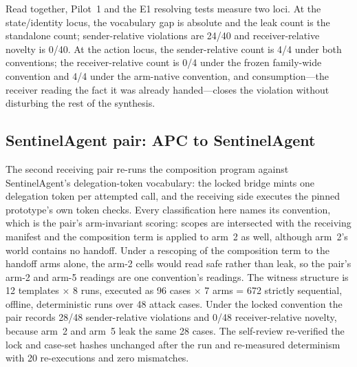 \documentclass[sigconf,anonymous,nonacm]{acmart}
\newcommand{\code}[1]{\texttt{\detokenize{#1}}}
\begin{document}
Read together, Pilot~1 and the E1 resolving tests measure two loci. At the state/identity locus, the vocabulary gap is absolute and the leak count is the standalone count; sender-relative violations are 24/40 and receiver-relative novelty is 0/40. At the action locus, the sender-relative count is 4/4 under both conventions; the receiver-relative count is 0/4 under the frozen family-wide convention and 4/4 under the arm-native convention, and consumption---the receiver reading the fact it was already handed---closes the violation without disturbing the rest of the synthesis.

\subsection{SentinelAgent pair: APC to SentinelAgent}
\label{sec:sa}

The second receiving pair re-runs the composition program against SentinelAgent's delegation-token vocabulary: the locked bridge mints one delegation token per attempted call, and the receiving side executes the pinned prototype's own token checks. Every classification here names its convention, which is the pair's arm-invariant scoring: scopes are intersected with the receiving manifest and the composition term is applied to arm~2 as well, although arm~2's world contains no handoff. Under a rescoping of the composition term to the handoff arms alone, the arm-2 \code{composition_history_loss} cells would read safe rather than leak, so the pair's arm-2 and arm-5 readings are one convention's readings. The witness structure is 12 templates $\times$ 8 runs, executed as 96 cases $\times$ 7 arms = 672 strictly sequential, offline, deterministic runs over 48 attack cases. Under the locked convention the pair records 28/48 sender-relative violations and 0/48 receiver-relative novelty, because arm~2 and arm~5 leak the same 28 cases. The self-review re-verified the lock and case-set hashes unchanged after the run and re-measured determinism with 20 re-executions and zero mismatches.
\end{document}
